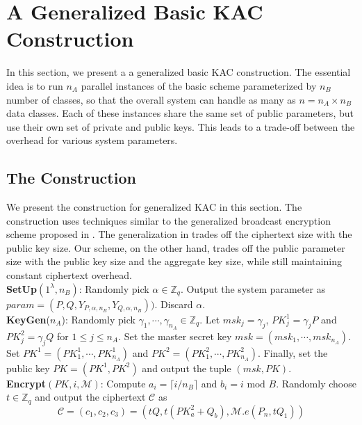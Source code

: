 \section{A Generalized Basic KAC Construction}
\label{sec:general}

In this section, we present a a generalized basic KAC construction. The essential idea is to run $n_A$ parallel instances of the basic scheme parameterized by $n_B$ number of classes, so that the overall system can handle as many as $n=n_A\times n_B$ data classes. Each of these instances share the same set of public parameters, but use their own set of private and public keys. This leads to a trade-off between the overhead for various system parameters. 

\subsection{The Construction}
\label{subsec:two-tier}

We present the construction for generalized KAC in this section. The construction uses techniques similar to the generalized broadcast encryption scheme proposed in \cite{boneh2005collusion}. The generalization in \cite{boneh2005collusion} trades off the ciphertext size with the public key size. Our scheme, on the other hand, trades off the public parameter size with the public key size and the aggregate key size, while still maintaining constant ciphertext overhead.\\

\noindent \textbf{SetUp}$(1^{\lambda},n_B)$: Randomly pick $\alpha \in \mathbb{Z}_q$. Output the system parameter as $param = (P,Q,Y_{P,\alpha,n_B},Y_{Q,\alpha,n_B}))$. Discard $\alpha$. \\

\noindent \textbf{KeyGen}($n_A$): Randomly pick $\gamma_{1},\cdots,\gamma_{n_A} \in \mathbb{Z}_q$. Let $msk_j=\gamma_j$, $PK^1_j=\gamma_{j}P$ and $PK^2_j=\gamma_{j}Q$ for $1\leq j \leq n_A$. Set the master secret key $msk=(msk_1,\cdots,msk_{n_A})$. Set $PK^1=(PK^1_1,\cdots,PK^1_{n_A})$ and $PK^2=(PK^2_1,\cdots,PK^2_{n_A})$. Finally, set the public key $PK=(PK^1,PK^2)$ and output the tuple $(msk,PK)$.\\

\noindent \textbf{Encrypt}$(PK,i,\mathcal{M})$: Compute $a_i=\lceil i/n_B\rceil$ and $b_i=i \text{ mod } B$. Randomly choose $t\in\mathbb{Z}_q$ and output the ciphertext $\mathcal{C}$ as 
 \begin{equation}
 \mathcal{C}=(c_1,c_2,c_3)=(tQ,t(PK^{2}_{a}+Q_{b}),\mathcal{M}.{e}(P_n,tQ_1)) \nonumber
 \end{equation} 

